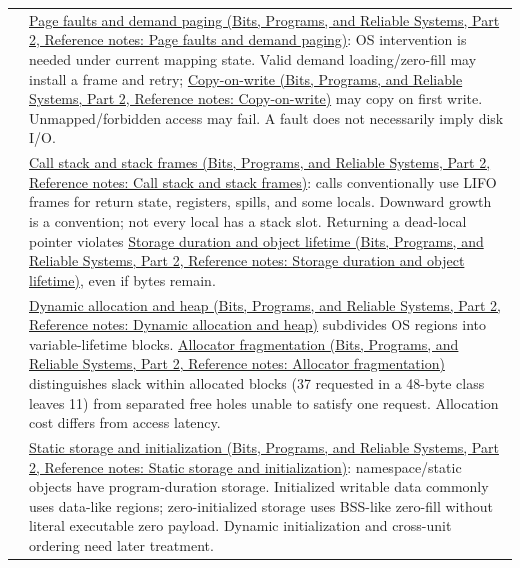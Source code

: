 {\begin{longtable}[]{@{}
  >{\raggedright\arraybackslash}p{}
  >{\raggedright\arraybackslash}p{}@{}}
56 & \href{../01-Bits-Programs-and-Reliable-Systems-P02/main.pdf\#nameddest=appendix-cc0909a7ef14}{Page faults and demand paging (Bits, Programs, and Reliable Systems, Part 2, Reference notes: Page faults and demand paging)}: OS intervention is needed under current mapping state. Valid demand loading/zero-fill may install a frame and retry; \href{../01-Bits-Programs-and-Reliable-Systems-P02/main.pdf\#nameddest=appendix-7a06e5baac04}{Copy-on-write (Bits, Programs, and Reliable Systems, Part 2, Reference notes: Copy-on-write)} may copy on first write. Unmapped/forbidden access may fail. A fault does not necessarily imply disk I/O. \\
57 & \href{../01-Bits-Programs-and-Reliable-Systems-P02/main.pdf\#nameddest=appendix-b081b7abe193}{Call stack and stack frames (Bits, Programs, and Reliable Systems, Part 2, Reference notes: Call stack and stack frames)}: calls conventionally use LIFO frames for return state, registers, spills, and some locals. Downward growth is a convention; not every local has a stack slot. Returning a dead-local pointer violates \href{../01-Bits-Programs-and-Reliable-Systems-P02/main.pdf\#nameddest=appendix-0b104bcba06b}{Storage duration and object lifetime (Bits, Programs, and Reliable Systems, Part 2, Reference notes: Storage duration and object lifetime)}, even if bytes remain. \\
58 & \href{../01-Bits-Programs-and-Reliable-Systems-P02/main.pdf\#nameddest=appendix-c3480f7d9ff3}{Dynamic allocation and heap (Bits, Programs, and Reliable Systems, Part 2, Reference notes: Dynamic allocation and heap)} subdivides OS regions into variable-lifetime blocks. \href{../01-Bits-Programs-and-Reliable-Systems-P02/main.pdf\#nameddest=appendix-a7c50686d81f}{Allocator fragmentation (Bits, Programs, and Reliable Systems, Part 2, Reference notes: Allocator fragmentation)} distinguishes slack within allocated blocks (37 requested in a 48-byte class leaves 11) from separated free holes unable to satisfy one request. Allocation cost differs from access latency. \\
59 & \href{../01-Bits-Programs-and-Reliable-Systems-P02/main.pdf\#nameddest=appendix-17c93c4c2f19}{Static storage and initialization (Bits, Programs, and Reliable Systems, Part 2, Reference notes: Static storage and initialization)}: namespace/static objects have program-duration storage. Initialized writable data commonly uses data-like regions; zero-initialized storage uses BSS-like zero-fill without literal executable zero payload. Dynamic initialization and cross-unit ordering need later treatment. \\

\end{longtable}}

